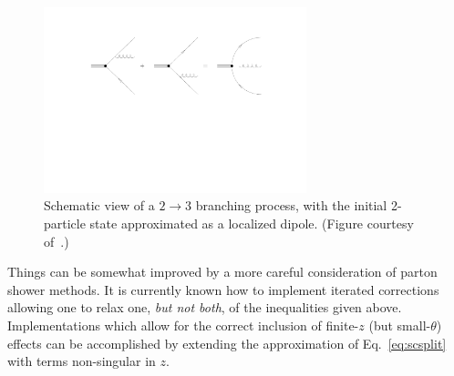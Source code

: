 \begin{figure}[tb!]
	\centering
	\includegraphics[width=0.68\textwidth,trim={5cm 11cm 5cm 3cm},clip]{figures/DS_dipole.pdf}
	\caption{Schematic view of a $2 \to 3$ branching process, with the initial 2-particle state approximated as a localized dipole. (Figure courtesy of~\cite{Ellis:1991qj}.)}
	\label{fig:dipoleant}
\end{figure}

Things can be somewhat improved by a more careful consideration of parton shower methods. It is currently known how to implement iterated corrections allowing one to relax one, \emph{but not both}, of the inequalities given above. Implementations which allow for the correct inclusion of finite-$z$ (but small-$\theta$) effects can be accomplished by extending the approximation of Eq.~\eqref{eq:scsplit} with terms non-singular in $z$.

